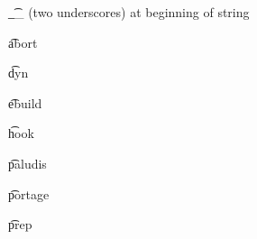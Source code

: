 \begin{compactitem}
\item \t{__} (two underscores) at beginning of string
\item \t{abort}
\item \t{dyn}
\item \t{ebuild}
\item \t{hook}
\item \t{paludis}
\item \t{portage}
\item \t{prep}
\end{compactitem}


